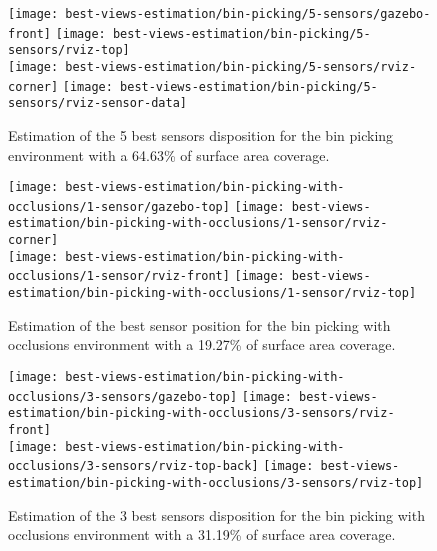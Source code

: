 \begin{figure}
	\centering
	\texttt{[image: best-views-estimation/bin-picking/5-sensors/gazebo-front]}\hspace{2em}
	\texttt{[image: best-views-estimation/bin-picking/5-sensors/rviz-top]}\\
	\texttt{[image: best-views-estimation/bin-picking/5-sensors/rviz-corner]}\hspace{2em}
	\texttt{[image: best-views-estimation/bin-picking/5-sensors/rviz-sensor-data]}
	\caption{Estimation of the 5 best sensors disposition for the bin picking environment with a 64.63\% of surface area coverage.}
\end{figure}

\begin{figure}
	\centering
	\texttt{[image: best-views-estimation/bin-picking-with-occlusions/1-sensor/gazebo-top]}\hspace{2em}
	\texttt{[image: best-views-estimation/bin-picking-with-occlusions/1-sensor/rviz-corner]}\\
	\texttt{[image: best-views-estimation/bin-picking-with-occlusions/1-sensor/rviz-front]}\hspace{2em}
	\texttt{[image: best-views-estimation/bin-picking-with-occlusions/1-sensor/rviz-top]}
	\caption{Estimation of the best sensor position for the bin picking with occlusions environment with a 19.27\% of surface area coverage.}
\end{figure}

\begin{figure}
	\centering
	\texttt{[image: best-views-estimation/bin-picking-with-occlusions/3-sensors/gazebo-top]}\hspace{2em}
	\texttt{[image: best-views-estimation/bin-picking-with-occlusions/3-sensors/rviz-front]}\\
	\texttt{[image: best-views-estimation/bin-picking-with-occlusions/3-sensors/rviz-top-back]}\hspace{2em}
	\texttt{[image: best-views-estimation/bin-picking-with-occlusions/3-sensors/rviz-top]}
	\caption{Estimation of the 3 best sensors disposition for the bin picking with occlusions environment with a 31.19\% of surface area coverage.}
\end{figure}

